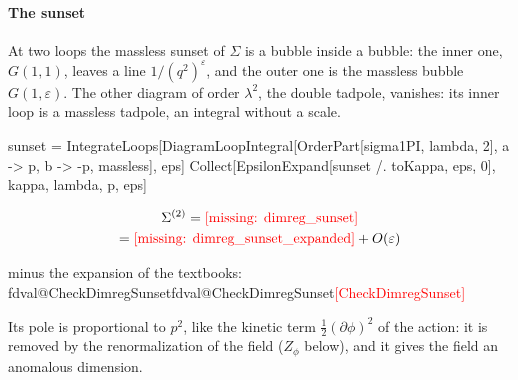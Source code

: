 \documentclass[11pt,a4paper]{article}
\makeatletter
\newcommand{\formula}[1]{\IfFileExists{figures/formula_#1.tex}{}{\text{\textcolor{red}{[missing: \detokenize{#1}]}}}}
\newcommand{\val}[1]{\ifcsname fdval@#1\endcsname\csname fdval@#1\endcsname\else\textcolor{red}{[#1]}\fi}
\makeatother
\begin{document}
\paragraph{The sunset} At two loops the massless sunset of $\Sigma$ is a bubble inside a bubble: the inner one, $G(1,1)$,
leaves a line $1/(q^2)^\varepsilon$, and the outer one is the massless bubble $G(1,\varepsilon)$. The other diagram of order
$\lambda^2$, the double tadpole, vanishes: its inner loop is a massless tadpole, an integral without a scale.
\begin{code}
sunset = IntegrateLoops[DiagramLoopIntegral[OrderPart[sigma1PI, lambda, 2],
    {a -> p, b -> -p}, massless], eps]
Collect[EpsilonExpand[sunset /. toKappa, eps, 0], {kappa, lambda, p, eps}]
\end{code}
\begin{outputbox}
\vspace{-6pt}
\begin{gather*}
\Sigma^{(2)}=\formula{dimreg_sunset}\\
=\formula{dimreg_sunset_expanded}+O(\varepsilon)
\end{gather*}
\end{outputbox}
\begin{result}
minus the expansion of the textbooks: \val{CheckDimregSunset}
\end{result}
Its pole is proportional to $p^2$, like the kinetic term $\frac12(\partial\phi)^2$ of the action: it is removed by the
renormalization of the field ($Z_\phi$ below), and it gives the field an anomalous dimension.
\end{document}
